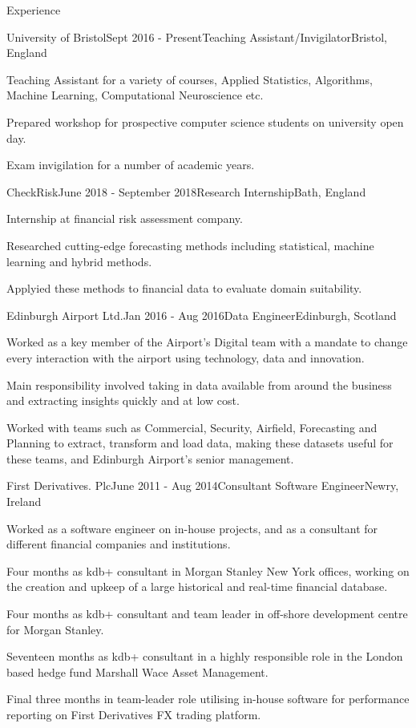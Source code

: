 \documentclass{resume} %
\begin{document}
\begin{rSection}{Experience}

\begin{rSubsection}{University of Bristol}{Sept 2016 - Present}{Teaching Assistant/Invigilator}{Bristol, England}
\item Teaching Assistant for a variety of courses, Applied Statistics, Algorithms, Machine Learning, Computational Neuroscience etc.
\item Prepared workshop for prospective computer science students on university open day.
\item Exam invigilation for a number of academic years.
\end{rSubsection}

\begin{rSubsection}{CheckRisk}{June 2018 - September 2018}{Research Internship}{Bath, England}
\item Internship at financial risk assessment company. 
\item Researched cutting-edge forecasting methods including statistical, machine learning and hybrid methods. 
\item Applyied these methods to financial data to evaluate domain suitability.
\end{rSubsection}

\begin{rSubsection}{Edinburgh Airport Ltd.}{Jan 2016 - Aug 2016}{Data Engineer}{Edinburgh, Scotland}
\item Worked as a key member of the Airport's Digital team with a mandate to change every interaction with the airport using technology, data and innovation.
\item Main responsibility involved taking in data available from around the business and extracting insights quickly and at low cost.
\item Worked with teams such as Commercial, Security, Airfield, Forecasting and Planning to extract, transform and load data, making these datasets useful for these teams, and Edinburgh Airport’s senior management.
\end{rSubsection}

\begin{rSubsection}{First Derivatives. Plc}{June 2011 - Aug 2014}{Consultant Software Engineer}{Newry, Ireland}
\item Worked as a software engineer on in-house projects, and as a consultant for different financial companies and institutions.
\item Four months as kdb+ consultant in Morgan Stanley New York offices, working on the creation and upkeep of a large historical and real-time financial database.
\item Four months as kdb+ consultant and team leader in off-shore development centre for Morgan Stanley.
\item Seventeen months as kdb+ consultant in a highly responsible role in the London based hedge fund Marshall Wace Asset Management.
\item Final three months in team-leader role utilising in-house software for performance reporting on First Derivatives FX trading platform.
\end{rSubsection}


\end{rSection}
\end{document}
